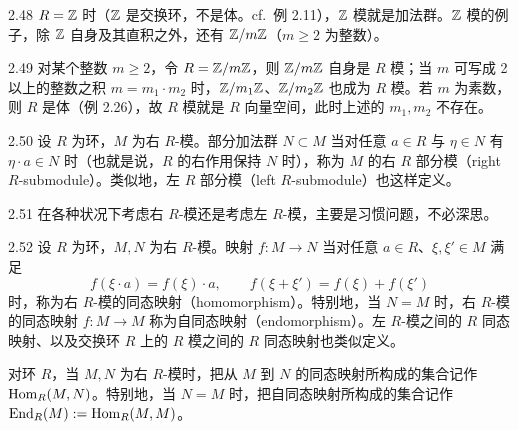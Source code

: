 \begin{example}{2.48} $R=\mathbb{Z}$ 时（$\mathbb{Z}$ 是交换环，不是体。cf.\ 例 2.11），$\mathbb{Z}$ 模就是加法群。$\mathbb{Z}$ 模的例子，除 $\mathbb{Z}$ 自身及其直积之外，还有 $\mathbb{Z}/m\mathbb{Z}$（$m\ge2$ 为整数）。\end{example}


\begin{example}{2.49} 对某个整数 $m\ge2$，令 $R=\mathbb{Z}/m\mathbb{Z}$，则 $\mathbb{Z}/m\mathbb{Z}$ 自身是 $R$ 模；当 $m$ 可写成 2 以上的整数之积 $m=m_1\cdot m_2$ 时，$\mathbb{Z}/m_1\mathbb{Z}$、$\mathbb{Z}/m_2\mathbb{Z}$ 也成为 $R$ 模。若 $m$ 为素数，则 $R$ 是体（例 2.26），故 $R$ 模就是 $R$ 向量空间，此时上述的 $m_1,m_2$ 不存在。\end{example}


\begin{definition}{2.50} 设 $R$ 为环，$M$ 为右 $R$-模。部分加法群 $N\subset M$ 当对任意 $a\in R$ 与 $\eta\in N$ 有 $\eta\cdot a\in N$ 时（也就是说，$R$ 的右作用保持 $N$ 时），称为 $M$ 的右 $R$ 部分模（right $R$-submodule）。类似地，左 $R$ 部分模（left $R$-submodule）也这样定义。\end{definition}

\begin{remark}{2.51} 在各种状况下考虑右 $R$-模还是考虑左 $R$-模，主要是习惯问题，不必深思。\end{remark}


\begin{definition}{2.52} 设 $R$ 为环，$M,N$ 为右 $R$-模。映射 $f\colon M\to N$ 当对任意 $a\in R$、$\xi,\xi'\in M$ 满足
\[
  f(\xi\cdot a)=f(\xi)\cdot a,\qquad f(\xi+\xi')=f(\xi)+f(\xi')
\]
时，称为右 $R$-模的同态映射（homomorphism）。特别地，当 $N=M$ 时，右 $R$-模的同态映射 $f\colon M\to M$ 称为自同态映射（endomorphism）。左 $R$-模之间的 $R$ 同态映射、以及交换环 $R$ 上的 $R$ 模之间的 $R$ 同态映射也类似定义。

对环 $R$，当 $M,N$ 为右 $R$-模时，把从 $M$ 到 $N$ 的同态映射所构成的集合记作 $\operatorname{Hom}_R(M,N)$。特别地，当 $N=M$ 时，把自同态映射所构成的集合记作 $\operatorname{End}_R(M):=\operatorname{Hom}_R(M,M)$。\end{definition}

